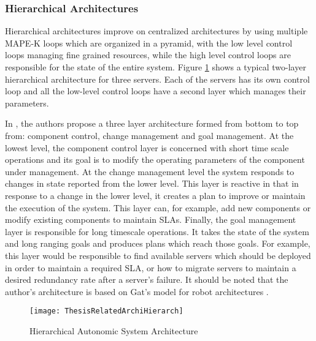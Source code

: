 \subsubsection{Hierarchical Architectures}

Hierarchical architectures improve on centralized architectures by using multiple MAPE-K loops which are organized in a pyramid, with the low level control loops managing fine grained resources, while the high level control loops are responsible for the state of the entire system. Figure \ref{fig:hierarchicalarchi} shows a typical two-layer hierarchical architecture for three servers. Each of the servers has its own control loop and all the low-level control loops have a second layer which manages their parameters.

In \cite{Kramer:hierarch}, the authors propose a three layer architecture formed from bottom to top from: component control, change management and goal management. At the lowest level, the component control layer is concerned with short time scale operations and its goal is to modify the operating parameters of the component under management. At the change management level the system responds to changes in state reported from the lower level. This layer is reactive in that in response to a change in the lower level, it creates a plan to improve or maintain the execution of the system. This layer can, for example, add new components or modify existing components to maintain SLAs. Finally, the goal management layer is responsible for long timescale operations. It takes the state of the system and long ranging goals and produces plans which reach those goals. For example, this layer would be responsible to find available servers which should be deployed in order to maintain a required SLA, or how to migrate servers to maintain a desired redundancy rate after a server's failure. It should be noted that the author's architecture is based on Gat's model for robot architectures \cite{gat:robots}. 

\begin{figure}
	\centering
		\texttt{[image: ThesisRelatedArchiHierarch]}
	\caption{Hierarchical Autonomic System Architecture}
	\label{fig:hierarchicalarchi}
\end{figure}

